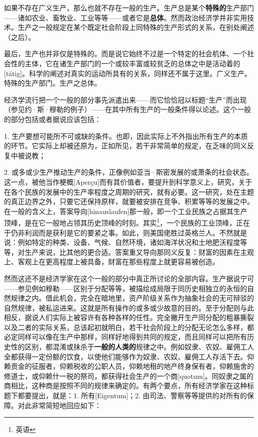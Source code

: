 \documentclass[a4paper,twoside,12pt]{ctexart}
\begin{document}
如果不存在广义生产，那么也就不存在一般的生产。生产总是某个\textbf{特殊的}生产部门——诸如农业、畜牧业、工业等等——或者它是\textbf{总体}。然而政治经济学并非实用技术。生产之一般规定在某个既定社会阶段上同特殊的生产形式的关系，在别处阐述（之后）。

最后，生产也并非仅是特殊的。而是说它始终不过是一个特定的社会机体、一个社会性的主体，它在诸生产部门的一个或较丰富或较贫乏的总体之中是活动着的[tätig]。科学的阐述对真实的运动所具有的关系，同样还不属于这里。广义生产。特殊的生产部门。生产之总体。

经济学流行把一个一般的部分事先派遣出来——而它恰恰冠以标题“生产”而出现（参见约·斯·穆勒的例子）——在其中所有生产的一般条件得以论述。这个一般的部分包括或者据说应该包括：

1. 生产要想可能所不可或缺的条件。也即，因此实际上不外指出所有生产的本质的环节。它实际上却被还原为，正如所见，若干非常简单的规定，在乏味的同义反复中被说教；

2. 或多或少生产推动生产的条件，正像例如亚当·斯密发展的或萧条的社会状态。这一点，被他当作梗概[Aperçu]而有其价值者，要提升到科学意义上，研究，关于在各个民族的发展中的生产率程度之周期的研究，就有必要。这一研究，处在主题的真正边界之外，只要它还保持原样，就要被安排在竞争、积累等等的发展之中。在一般的含义上，答案导向[hinauslaufen]那一般，即一个工业民族之占据其生产顶峰，是在它一般地占领其历史顶峰的时刻。其实\footnote{英语}，一个民族的工业顶峰，正在于仍非利润而是获利是它的要紧之事。如此，则美国佬胜过英格兰人。不然就是说：例如特定的种类、设备、气候、自然环境，诸如海洋状况和土地肥沃程度等等，对生产来说，比其他的更合适。答案重又导向那同义反复：财富的因素在主观上、客观上在更高程度上被具备，财富在那些程度上就更容易被创造。

然而这还不是经济学家在这个一般的部分中真正所讨论的全部内容。生产据说宁可——参见例如穆勒——区别于分配等等，被描绘成局限于同历史相独立的永恒的自然规律之内。借此机会，完全在暗地里，资产阶级关系作为抽象社会的无可辩驳的自然规律，被私运进来。这就是所有操作的或多或少故意的目的。至于分配则与此相反，据说人们实际上被容许有各种各样的任性。完全撇开生产同分配的粗暴撕裂以及二者的实际关系，总该起初就明白，若干社会阶段上的分配无论怎么多样，都必定同样可以像在生产中那样，同样好地得到共同的规定，而且同样可以把所有历史性的区别，都混淆或抹杀于\textbf{一般的人类的}规律之中。例如奴隶、农奴、雇佣工人全都获得一定份额的饮食，以使他们能够作为奴隶、农奴、雇佣工人存活下去。仰赖贡金的征服者，仰赖税收的公职人员，仰赖地租的地产终身保有者，仰赖施舍的修道士，或仰赖什一税的祭司，都获得社会生产的一个商[quotum]。同奴隶之属的商相比，这种商是按照不同的规律来确定的。有两个要点，所有经济学家在这种标题下都要提出，就是：1. 所有[Eigentum]；2. 由司法、警察等等提供的对所有的保障。对此非常简短地回应如下：
\end{document}
